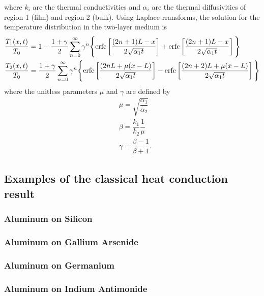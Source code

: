 \documentclass[letterpaper,11pt]{article}
\begin{document}
where $k_i$ are the thermal conductivities and $\alpha_i$ are the thermal diffusivities of region 1 (film) and region 2 (bulk).  
Using Laplace rransforms, the solution for the temperature distribution in the two-layer medium is
\begin{subequations}
\begin{align}
& \dfrac{T_1(x,t)}{T_0}=1-\dfrac{1+\gamma}{2}\sum\limits_{n=0}^\infty \gamma^n \Bigg\{ \textnormal{erfc} \left[ \dfrac{(2n+1)L-x}{2\sqrt{\alpha_1 t}} \right] + \textnormal{erfc} \left[ \dfrac{(2n+1)L-x}{2\sqrt{\alpha_1 t}} \right] \Bigg\}  \\
& \dfrac{T_2(x,t)}{T_0}=\dfrac{1+\gamma}{2}\sum\limits_{n=0}^\infty \gamma^n \Bigg\{ \textnormal{erfc} \left[ \dfrac{(2nL+\mu(x-L)}{2\sqrt{\alpha_1 t}} \right] - \textnormal{erfc} \left[ \dfrac{(2n+2)L+\mu(x-L)}{2\sqrt{\alpha_1 t}} \right] \Bigg\} 
\end{align}
\end{subequations}
where the unitless parameters $\mu$ and $\gamma$ are defined by
\begin{subequations}
\begin{align}
& \mu = \sqrt{\dfrac{\alpha_1}{\alpha_2}} \\
& \beta = \dfrac{k_1}{k_2} \dfrac{1}{\mu} \\
& \gamma = \dfrac{\beta -1}{\beta+1} .
\end{align}
\end{subequations}

\subsection{Examples of the classical heat conduction result}

\subsubsection{Aluminum on Silicon}

\subsubsection{Aluminum on Gallium Arsenide}

\subsubsection{Aluminum on Germanium}

\subsubsection{Aluminum on Indium Antimonide}
\end{document}
